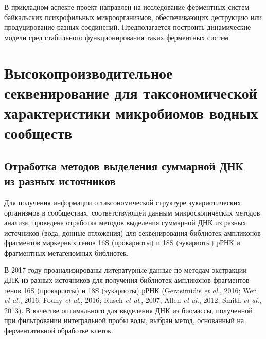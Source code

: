 \documentclass[a4paper,12pt,openany,final]{extreport}
\newcommand\theyear{2017}
\newcommand\MA[2]{{\sffamily\color{red}\hsmash{$\uparrow$}%
  \smash{\toplap{#1}{\scriptsize\bfseries #2}}}}
\renewcommand\MA[2]{}
\begin{document}
В прикладном аспекте проект направлен на исследование ферментных систем байкальских психрофильных микроорганизмов, обеспечивающих деструкцию или продуцирование разных соединений. Предполагается построить динамические модели сред стабильного функционирования таких ферментных систем.

\chapter{Высокопроизводительное секвенирование для таксономической характеристики микробиомов водных сообществ}
\label{chap:1}

\section[Отработка методов выделения суммарной ДНК из разных источников]{Отработка методов выделения суммарной ДНК\\ из разных источников}

Для получения информации о таксономической структуре эукариотических организмов в сообществах, соответствующей данным микроскопических методов анализа, проведена отработка методов выделения суммарной ДНК из разных источников (вода, донные отложения) для секвенирования библиотек ампликонов фрагментов маркерных генов 16S (прокариоты) и 18S (эукариоты) рРНК и фрагментных метагеномных библиотек.

В \theyear{} году проанализированы литературные данные по методам экстракции ДНК из разных источников для получения библиотек ампликонов фрагментов генов 16S (прокариоты) и 18S (эукариоты) рРНК (Gerasimidis \textit{et al}., 2016; Wen \textit{et al}., 2016; Fouhy \textit{et al}., 2016; Rusch \textit{et al}., 2007; Allen \textit{et al}., 2012; Smith \textit{et al}., 2013). В качестве оптимального\MA{l}{Каков критерий оптимальности?} для выделения ДНК из биомассы, полученной при фильтровании интегральной пробы воды, выбран метод, основанный на ферментативной обработке клеток.
\end{document}
